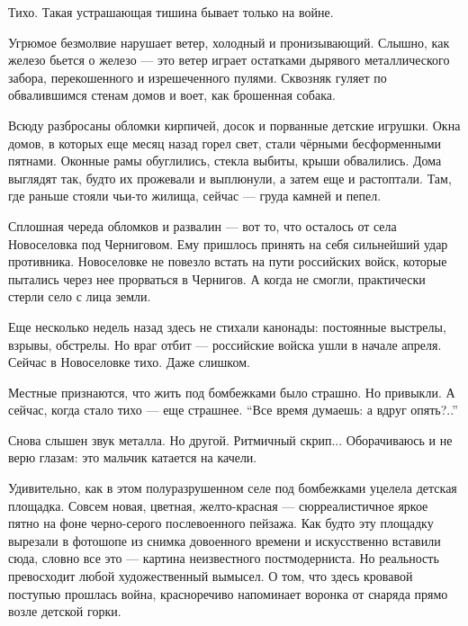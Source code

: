  
 
 
 
 

Тихо. Такая устрашающая тишина бывает только на войне.

Угрюмое безмолвие нарушает ветер, холодный и пронизывающий. Слышно, как железо
бьется о железо — это ветер играет остатками дырявого металлического забора,
перекошенного и изрешеченного пулями. Сквозняк гуляет по обвалившимся стенам
домов и воет, как брошенная собака.


Всюду разбросаны обломки кирпичей, досок и порванные детские игрушки. Окна
домов, в которых еще месяц назад горел свет, стали чёрными бесформенными
пятнами. Оконные рамы обуглились, стекла выбиты, крыши обвалились. Дома
выглядят так, будто их прожевали и выплюнули, а затем еще и растоптали. Там,
где раньше стояли чьи-то жилища, сейчас — груда камней и пепел. 

Сплошная череда обломков и развалин — вот то, что осталось от села Новоселовка
под Черниговом. Ему пришлось принять на себя сильнейший удар противника.
Новоселовке не повезло встать на пути российских войск, которые пытались через
нее прорваться в Чернигов. А когда не смогли, практически стерли село с лица
земли. 

Еще несколько недель назад здесь не стихали канонады: постоянные выстрелы,
взрывы, обстрелы. Но враг отбит — российские войска ушли в начале апреля.
Сейчас в Новоселовке тихо. Даже слишком. 

Местные признаются, что жить под бомбежками было страшно. Но привыкли. А
сейчас, когда стало тихо — еще страшнее. \enquote{Все время думаешь: а вдруг опять?..}

Снова слышен звук металла. Но другой. Ритмичный скрип... Оборачиваюсь и не верю
глазам: это мальчик катается на качели. 

Удивительно, как в этом полуразрушенном селе под бомбежками уцелела детская
площадка. Совсем новая, цветная, желто-красная — сюрреалистичное яркое пятно на
фоне черно-серого послевоенного пейзажа. Как будто эту площадку вырезали в
фотошопе из снимка довоенного времени и искусственно вставили сюда, словно все
это — картина неизвестного постмодерниста. Но реальность превосходит любой
художественный вымысел. О том, что здесь кровавой поступью прошлась война,
красноречиво напоминает воронка от снаряда прямо возле детской горки. 

